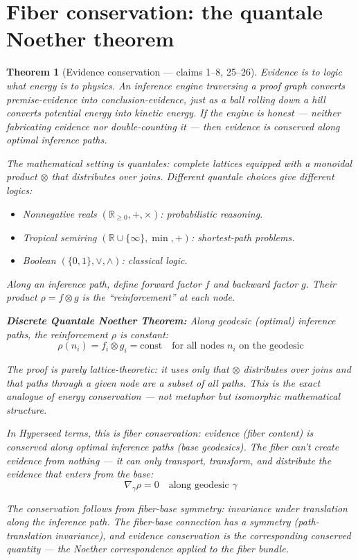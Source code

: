 \documentclass[11pt,a4paper]{article}
\newtheorem{theorem}[definition]{Theorem}
\begin{document}
\section{Fiber conservation: the quantale Noether theorem}
\label{sec:noether}

\begin{theorem}[Evidence conservation --- claims 1--8, 25--26]
\label{thm:noether-v1}
Evidence is to logic what energy is to physics. An inference engine
traversing a proof graph converts premise-evidence into conclusion-evidence,
just as a ball rolling down a hill converts potential energy into kinetic
energy. If the engine is honest --- neither fabricating evidence nor
double-counting it --- then evidence is conserved along optimal inference
paths.

The mathematical setting is quantales: complete lattices equipped with a
monoidal product $\otimes$ that distributes over joins. Different quantale
choices give different logics:
\begin{itemize}
\item Nonnegative reals $(\mathbb{R}_{\geq 0}, +, \times)$: probabilistic reasoning.
\item Tropical semiring $(\mathbb{R} \cup \{\infty\}, \min, +)$: shortest-path problems.
\item Boolean $(\{0,1\}, \lor, \land)$: classical logic.
\end{itemize}

Along an inference path, define forward factor $f$ and backward factor $g$.
Their product $\rho = f \otimes g$ is the ``reinforcement'' at each node.

\textbf{Discrete Quantale Noether Theorem:} Along geodesic (optimal)
inference paths, the reinforcement $\rho$ is constant:
\[
  \rho(n_i) = f_i \otimes g_i = \text{const} \quad
  \text{for all nodes } n_i \text{ on the geodesic}
\]

The proof is purely lattice-theoretic: it uses only that $\otimes$
distributes over joins and that paths through a given node are a subset
of all paths. This is the exact analogue of energy conservation ---
not metaphor but isomorphic mathematical structure.

In Hyperseed terms, this is \emph{fiber conservation}: evidence (fiber
content) is conserved along optimal inference paths (base geodesics).
The fiber can't create evidence from nothing --- it can only transport,
transform, and distribute the evidence that enters from the base:
\[
  \nabla_{\gamma} \rho = 0 \quad \text{along geodesic } \gamma
\]

The conservation follows from \emph{fiber-base symmetry}: invariance
under translation along the inference path. The fiber-base connection
has a symmetry (path-translation invariance), and evidence conservation
is the corresponding conserved quantity --- the Noether correspondence
applied to the fiber bundle.
\end{theorem}
\end{document}
